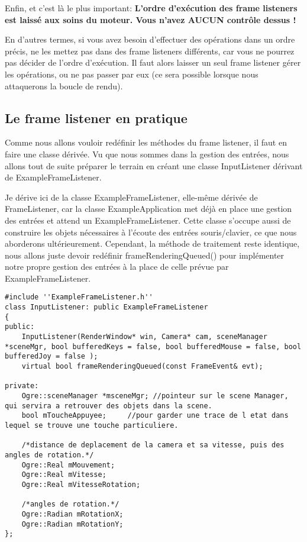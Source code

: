 Enfin, et c'est là le plus important:
\textbf{L'ordre d'exécution des frame listeners est laissé aux soins du moteur. Vous n'avez AUCUN contrôle dessus !}

En d'autres termes, si vous avez besoin d'effectuer des opérations dans un ordre précis, ne les mettez pas dans des frame listeners différents, car vous ne pourrez pas décider de l'ordre d'exécution. Il faut alors laisser un seul frame listener gérer les opérations, ou ne pas passer par eux (ce sera possible lorsque nous attaquerons la boucle de rendu).



\subsection{Le frame listener en pratique}

Comme nous allons vouloir redéfinir les méthodes du frame listener, il faut en faire une classe dérivée. Vu que nous sommes dans la gestion des entrées, nous allons tout de suite préparer le terrain en créant une classe InputListener dérivant de ExampleFrameListener.

Je dérive ici de la classe ExampleFrameListener, elle-même dérivée de FrameListener, car la classe ExampleApplication met déjà en place une gestion des entrées et attend un ExampleFrameListener. Cette classe s'occupe aussi de construire les objets nécessaires à l'écoute des entrées souris/clavier, ce que nous aborderons ultérieurement.
Cependant, la méthode de traitement reste identique, nous allons juste devoir redéfinir frameRenderingQueued() pour implémenter notre propre gestion des entrées à la place de celle prévue par ExampleFrameListener.


\begin{lstlisting}[caption={InputListener.h}]
#include ''ExampleFrameListener.h''
class InputListener: public ExampleFrameListener
{
public:
    InputListener(RenderWindow* win, Camera* cam, sceneManager *sceneMgr, bool bufferedKeys = false, bool bufferedMouse = false, bool bufferedJoy = false );
    virtual bool frameRenderingQueued(const FrameEvent& evt);

private:
    Ogre::sceneManager *msceneMgr; //pointeur sur le scene Manager, qui servira a retrouver des objets dans la scene.
    bool mToucheAppuyee;	 //pour garder une trace de l etat dans lequel se trouve une touche particuliere.

    /*distance de deplacement de la camera et sa vitesse, puis des angles de rotation.*/
    Ogre::Real mMouvement;
    Ogre::Real mVitesse;
    Ogre::Real mVitesseRotation;

	/*angles de rotation.*/
    Ogre::Radian mRotationX;
    Ogre::Radian mRotationY;
};
\end{lstlisting}




